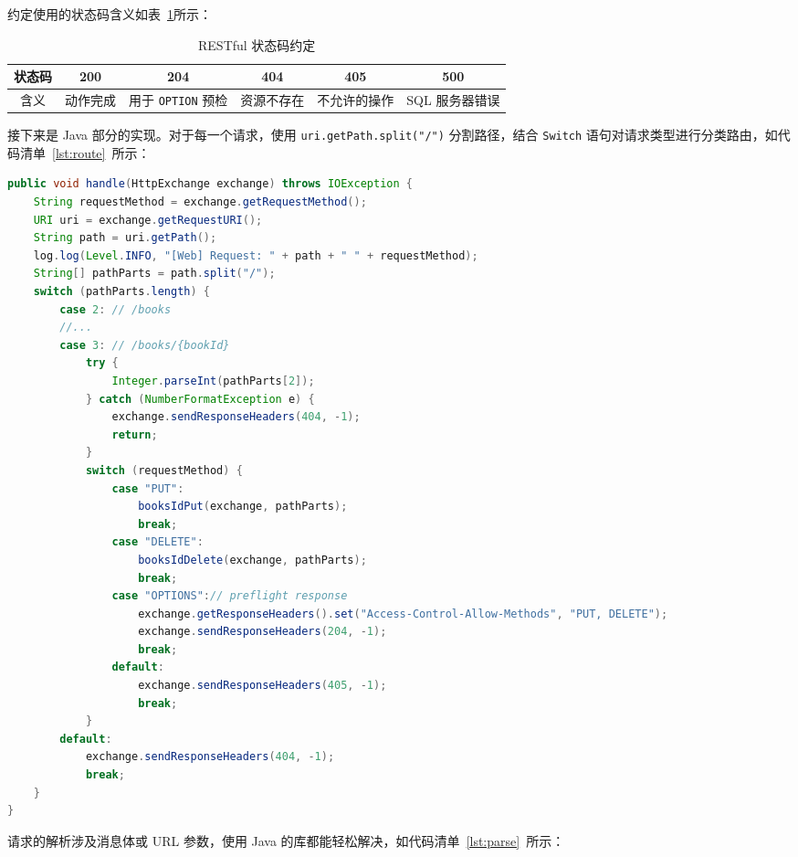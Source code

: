 \documentclass[a4paper,oneside]{ctexbook}
\begin{document}
约定使用的状态码含义如表~\ref{tab:code}所示：

\begin{table}[h!]
    \caption{RESTful 状态码约定}
    \centering
    \label{tab:code}
    \begin{tabular}{cccccc}
        \toprule
        状态码 & 200 & 204 & 404 & 405 & 500\\
        \midrule
        含义 & 动作完成 & 用于 \verb|OPTION| 预检 & 资源不存在 & 不允许的操作 & SQL 服务器错误\\
        \bottomrule
    \end{tabular}
\end{table}

接下来是 Java 部分的实现。对于每一个请求，使用 \verb|uri.getPath.split("/")| 分割路径，结合 \verb|Switch| 语句对请求类型进行分类路由，如代码清单~\ref{lst:route}~所示：

\begin{lstlisting}[language=java, caption=路由,label=lst:route]
public void handle(HttpExchange exchange) throws IOException {
    String requestMethod = exchange.getRequestMethod();
    URI uri = exchange.getRequestURI();
    String path = uri.getPath();
    log.log(Level.INFO, "[Web] Request: " + path + " " + requestMethod);
    String[] pathParts = path.split("/");
    switch (pathParts.length) {
        case 2: // /books
        //... 
        case 3: // /books/{bookId}
            try {
                Integer.parseInt(pathParts[2]);
            } catch (NumberFormatException e) {
                exchange.sendResponseHeaders(404, -1);
                return;
            }
            switch (requestMethod) {
                case "PUT":
                    booksIdPut(exchange, pathParts);
                    break;
                case "DELETE":
                    booksIdDelete(exchange, pathParts);
                    break;
                case "OPTIONS":// preflight response
                    exchange.getResponseHeaders().set("Access-Control-Allow-Methods", "PUT, DELETE");
                    exchange.sendResponseHeaders(204, -1);
                    break;
                default:
                    exchange.sendResponseHeaders(405, -1);
                    break;
            }
        default:
            exchange.sendResponseHeaders(404, -1);
            break;
    }
}
\end{lstlisting}

请求的解析涉及消息体或 URL 参数，使用 Java 的库都能轻松解决，如代码清单~\ref{lst:parse}~所示：
\end{document}
